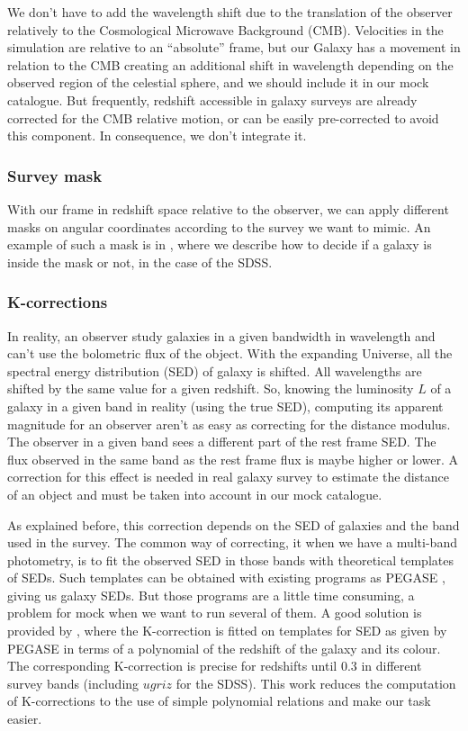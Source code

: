 We don't have to add the wavelength shift due to the translation of the
observer relatively to the Cosmological Microwave Background (CMB). Velocities
in the simulation are relative to an ``absolute'' frame, but our Galaxy has a
movement in relation to the CMB creating an additional shift in wavelength
depending on the observed region of the celestial sphere, and we should include
it in our mock catalogue. But frequently, redshift accessible in galaxy surveys
are already corrected for the CMB relative motion, or can be easily
pre-corrected to avoid this component. In consequence, we don't integrate it.

\subsubsection{Survey mask}

With our frame in redshift space relative to the observer, we can apply
different masks on angular coordinates according to the survey we want to
mimic. An example of such a mask is in , where we describe
how to decide if a galaxy is inside the mask or not, in the case of the SDSS\@.

\subsubsection{K-corrections}

In reality, an observer study galaxies in a given bandwidth in wavelength and
can't use the bolometric flux of the object. With the expanding Universe, all
the spectral energy distribution (SED) of galaxy is shifted. All wavelengths
are shifted by the same value for a given redshift. So, knowing the luminosity
$L$ of a galaxy in a given band in reality (using the true SED), computing its
apparent magnitude for an observer aren't as easy as correcting for the
distance modulus. The observer in a given band sees a different part of the
rest frame SED\@. The flux observed in the same band as the rest frame flux is
maybe higher or lower. A correction for this effect is needed in real galaxy
survey to estimate the distance of an object and must be taken into account in
our mock catalogue.

As explained before, this correction depends on the SED of galaxies and the
band used in the survey. The common way of correcting, it when we have a
multi-band photometry, is to fit the observed SED in those bands with
theoretical templates of SEDs. Such templates can be obtained with existing
programs as PEGASE \citep{LeBorgne+04}, giving us galaxy SEDs. But those
programs are a little time consuming, a problem for mock when we want to run
several of them. A good solution is provided by \citet{Chilingarian+10}, where
the K-correction is fitted on templates for SED as given by PEGASE in terms of
a polynomial of the redshift of the galaxy and its colour. The corresponding
K-correction is precise for redshifts until 0.3 in different survey bands
(including $ugriz$ for the SDSS). This work reduces the computation of
K-corrections to the use of simple polynomial relations and make our task
easier.

